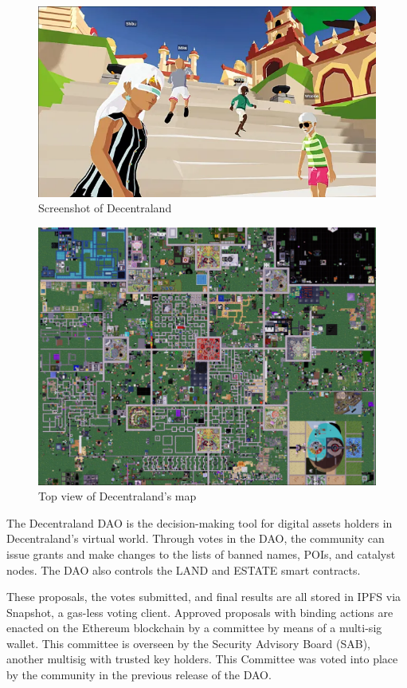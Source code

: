 \documentclass[MSE,Master,english]{twbook}%
\begin{document}
\begin{figure}[H]
  \centering
  \includegraphics[width=\textwidth]{dcl.png}
  \caption{Screenshot of Decentraland}
  \label{fig:dcl}
\end{figure}

\begin{figure}[H]
  \centering
  \includegraphics[width=.8\textwidth]{dcl_map.png}
  \caption{Top view of Decentraland's map \cite{genesisCity}}
  \label{fig:dcl_map}
\end{figure}

The Decentraland DAO\cite{DCLDAO} is the decision-making tool for digital assets holders in Decentraland's virtual world. Through votes in the DAO, the community can issue grants and make changes to the lists of banned names, POIs, and catalyst nodes. The DAO also controls the \gls{LAND} and \gls{ESTATE} smart contracts.

These proposals, the votes submitted, and final results are all stored in IPFS via Snapshot, a gas-less voting client. Approved proposals with binding actions are enacted on the Ethereum blockchain by a committee by means of a multi-sig wallet. This committee is overseen by the Security Advisory Board (SAB), another multisig with trusted key holders. This Committee was voted into place by the community in the previous release of the DAO.
\end{document}
